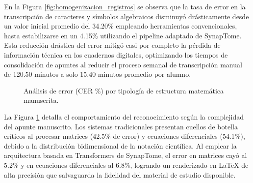 \vspace{0.4cm}

En la Figura \ref{fig:homogenizacion_registros} se observa que la tasa de error en la transcripción de caracteres y símbolos algebraicos disminuyó drásticamente desde un valor inicial promedio del 34.20\% empleando herramientas convencionales, hasta estabilizarse en un 4.15\% utilizando el pipeline adaptado de SynapTome. Esta reducción drástica del error mitigó casi por completo la pérdida de información técnica en los cuadernos digitales, optimizando los tiempos de consolidación de apuntes al reducir el proceso semanal de transcripción manual de 120.50 minutos a solo 15.40 minutos promedio por alumno.

\vspace{0.4cm}

\begin{figure}[H]
\centering
{}
\caption{Análisis de error (CER \%) por tipología de estructura matemática manuscrita.}
\label{fig:sta_lta_scvm}
\end{figure}

\vspace{0.4cm}

La Figura \ref{fig:sta_lta_scvm} detalla el comportamiento del reconocimiento según la complejidad del apunte manuscrito. Los sistemas tradicionales presentan cuellos de botella críticos al procesar matrices (42.5\% de error) y ecuaciones diferenciales (54.1\%), debido a la distribución bidimensional de la notación científica. Al emplear la arquitectura basada en Transformers de SynapTome, el error en matrices cayó al 5.2\% y en ecuaciones diferenciales al 6.8\%, logrando un renderizado en \LaTeX{} de alta precisión que salvaguarda la fidelidad del material de estudio disponible.


